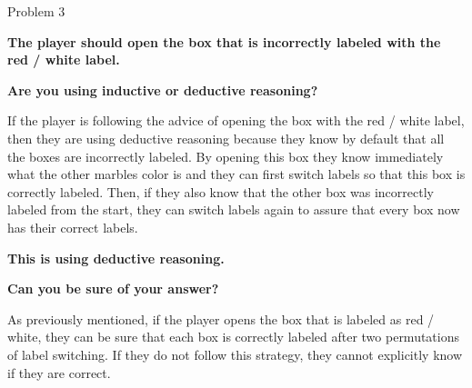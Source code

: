 \begin{problem}{Problem 3}
\begin{highlight}[Solution]
        \begin{center}
            \textbf{The player should open the box that is incorrectly labeled with the red / white label.}
        \end{center}

        \noindent \textbf{Are you using inductive or deductive reasoning?} \vspace*{1em}

        If the player is following the advice of opening the box with the red / white label, then they are using deductive reasoning because they know by default that all the boxes are incorrectly labeled. By opening this
        box they know immediately what the other marbles color is and they can first switch labels so that this box is correctly labeled. Then, if they also know that the other box was incorrectly labeled from the start, they
        can switch labels again to assure that every box now has their correct labels.

        \begin{center}
            \textbf{This is using deductive reasoning.}
        \end{center}

        \noindent \textbf{Can you be sure of your answer?} \vspace*{1em}

        As previously mentioned, if the player opens the box that is labeled as red / white, they can be sure that each box is correctly labeled after two permutations of label switching. If they do not follow this strategy,
        they cannot explicitly know if they are correct.

    \end{highlight}
\end{problem}

